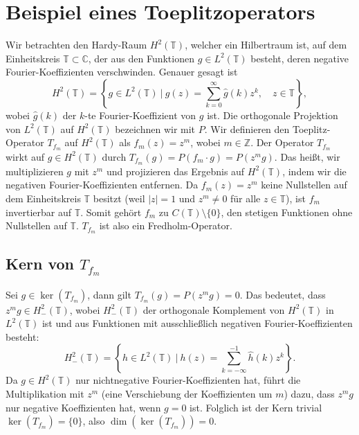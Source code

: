 \documentclass[11pt, hidelinks]{article}
\numberwithin{conj}{section}
\begin{document}
\section{Beispiel eines Toeplitzoperators}
Wir betrachten den Hardy-Raum \( H^2(\mathbb{T}) \), welcher ein Hilbertraum ist, auf dem Einheitskreis \( \mathbb{T} \subset \mathbb{C} \), der aus den Funktionen \( g \in L^2(\mathbb{T}) \) besteht, deren negative Fourier-Koeffizienten verschwinden. Genauer gesagt ist
\[
H^2(\mathbb{T}) = \left\{ g \in L^2(\mathbb{T}) \ \bigg|\ g(z) = \sum_{k=0}^\infty \hat{g}(k) z^k, \quad z \in \mathbb{T} \right\},
\]
wobei \( \hat{g}(k) \) der \( k \)-te Fourier-Koeffizient von \( g \) ist. Die orthogonale Projektion von \( L^2(\mathbb{T}) \) auf \( H^2(\mathbb{T}) \) bezeichnen wir mit \( P \). Wir definieren den Toeplitz-Operator \( T_{f_m} \) auf \( H^2(\mathbb{T}) \) als \( f_m(z) = z^m \), wobei \( m \in \mathbb{Z} \). Der Operator \( T_{f_m} \) wirkt auf \( g \in H^2(\mathbb{T}) \) durch $T_{f_m}(g) = P(f_m \cdot g) = P(z^m g)$. Das heißt, wir multiplizieren \( g \) mit \( z^m \) und projizieren das Ergebnis auf \( H^2(\mathbb{T}) \), indem wir die negativen Fourier-Koeffizienten entfernen. Da \( f_m(z) = z^m \) keine Nullstellen auf dem Einheitskreis \( \mathbb{T} \) besitzt (weil \( |z| = 1 \) und \( z^m \neq 0 \) für alle \( z \in \mathbb{T} \)), ist \( f_m \) invertierbar auf \( \mathbb{T} \). Somit gehört \( f_m \) zu \( C(\mathbb{T}) \setminus \{0\} \), den stetigen Funktionen ohne Nullstellen auf \( \mathbb{T} \). \( T_{f_m} \) ist also ein Fredholm-Operator.

\subsection{Kern von \( T_{f_m} \)}
Sei \( g \in \ker(T_{f_m}) \), dann gilt $T_{f_m}(g) = P(z^m g) = 0$. Das bedeutet, dass \( z^m g \in H^2_-(\mathbb{T}) \), wobei \( H^2_-(\mathbb{T}) \) der orthogonale Komplement von \( H^2(\mathbb{T}) \) in \( L^2(\mathbb{T}) \) ist und aus Funktionen mit ausschließlich negativen Fourier-Koeffizienten besteht:
\[
H^2_-(\mathbb{T}) = \left\{ h \in L^2(\mathbb{T}) \ \bigg|\ h(z) = \sum_{k=-\infty}^{-1} \hat{h}(k) z^k \right\}.
\]
Da \( g \in H^2(\mathbb{T}) \) nur nichtnegative Fourier-Koeffizienten hat, führt die Multiplikation mit \( z^m \) (eine Verschiebung der Koeffizienten um \( m \)) dazu, dass \( z^m g \) nur negative Koeffizienten hat, wenn \( g = 0 \) ist. Folglich ist der Kern trivial $\ker(T_{f_m}) = \{0\}$, also \( \dim(\ker(T_{f_m})) = 0 \).
\end{document}
